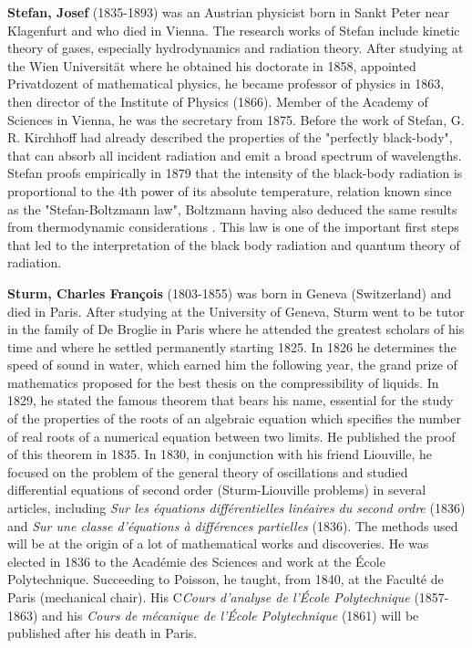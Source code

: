 \textbf{Stefan, Josef} (1835-1893) was an Austrian physicist born in Sankt Peter near Klagenfurt and who died in Vienna. The research works of Stefan include kinetic theory of gases, especially hydrodynamics and radiation theory. After studying at the Wien Universität where he obtained his doctorate in 1858, appointed Privatdozent of mathematical physics, he became professor of physics in 1863, then director of the Institute of Physics (1866). Member of the Academy of Sciences in Vienna, he was the secretary from 1875. Before the work of Stefan, G. R. Kirchhoff had already described the properties of the "perfectly black-body", that can absorb all incident radiation and emit a broad spectrum of wavelengths. Stefan proofs empirically in 1879 that the intensity of the black-body radiation is proportional to the 4th power of its absolute temperature, relation known since as the "Stefan-Boltzmann law", Boltzmann having also deduced the same results from thermodynamic considerations . This law is one of the important first steps that led to the interpretation of the black body radiation and quantum theory of radiation.

\textbf{Sturm, Charles François} (1803-1855) was born in Geneva (Switzerland) and died in Paris. After studying at the University of Geneva, Sturm went to be tutor in the family of De Broglie in Paris where he attended the greatest scholars of his time and where he settled permanently starting 1825. In 1826 he determines the speed of sound in water, which earned him the following year, the grand prize of mathematics proposed for the best thesis on the compressibility of liquids. In 1829, he stated the famous theorem that bears his name, essential for the study of the properties of the roots of an algebraic equation which specifies the number of real roots of a numerical equation between two limits. He published the proof of this theorem in 1835. In 1830, in conjunction with his friend Liouville, he focused on the problem of the general theory of oscillations and studied differential equations of second order (Sturm-Liouville problems) in several articles, including \textit{Sur les équations différentielles linéaires du second ordre} (1836) and \textit{Sur une classe d'équations à différences partielles} (1836). The methods used will be at the origin of a lot of mathematical works and discoveries. He was elected in 1836 to the Académie des Sciences and work at the École Polytechnique. Succeeding to Poisson, he taught, from 1840, at the Faculté de Paris (mechanical chair). His C\textit{Cours d'analyse de l'École Polytechnique} (1857-1863) and his \textit{Cours de mécanique de l'École Polytechnique} (1861) will be published after his death in Paris.


